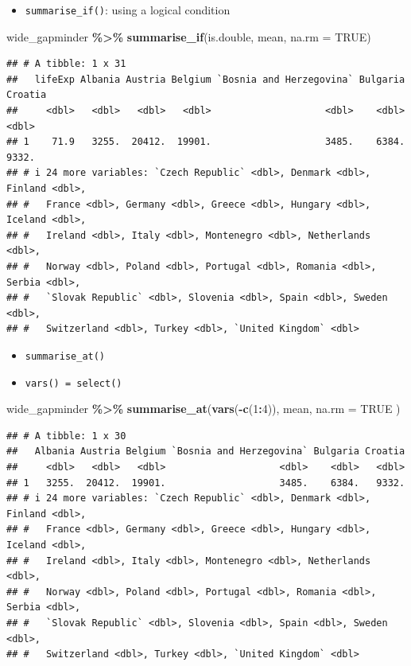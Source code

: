 \documentclass[
]{book}
\newenvironment{Shaded}{\begin{snugshade}}{\end{snugshade}}
\newcommand{\AttributeTok}[1]{\textcolor[rgb]{0.13,0.29,0.53}{#1}}
\newcommand{\ConstantTok}[1]{\textcolor[rgb]{0.56,0.35,0.01}{#1}}
\newcommand{\DecValTok}[1]{\textcolor[rgb]{0.00,0.00,0.81}{#1}}
\newcommand{\FunctionTok}[1]{\textcolor[rgb]{0.13,0.29,0.53}{\textbf{#1}}}
\newcommand{\NormalTok}[1]{#1}
\newcommand{\SpecialCharTok}[1]{\textcolor[rgb]{0.81,0.36,0.00}{\textbf{#1}}}
\providecommand{\tightlist}{%
  \setlength{\itemsep}{0pt}\setlength{\parskip}{0pt}}
\begin{document}
\begin{itemize}
\tightlist
\item
  \texttt{summarise\_if()}: using a logical condition
\end{itemize}

\begin{Shaded}
\begin{Highlighting}[]
\NormalTok{wide\_gapminder }\SpecialCharTok{\%\textgreater{}\%}
  \FunctionTok{summarise\_if}\NormalTok{(is.double, mean, }\AttributeTok{na.rm =} \ConstantTok{TRUE}\NormalTok{)}
\end{Highlighting}
\end{Shaded}

\begin{verbatim}
## # A tibble: 1 x 31
##   lifeExp Albania Austria Belgium `Bosnia and Herzegovina` Bulgaria Croatia
##     <dbl>   <dbl>   <dbl>   <dbl>                    <dbl>    <dbl>   <dbl>
## 1    71.9   3255.  20412.  19901.                    3485.    6384.   9332.
## # i 24 more variables: `Czech Republic` <dbl>, Denmark <dbl>, Finland <dbl>,
## #   France <dbl>, Germany <dbl>, Greece <dbl>, Hungary <dbl>, Iceland <dbl>,
## #   Ireland <dbl>, Italy <dbl>, Montenegro <dbl>, Netherlands <dbl>,
## #   Norway <dbl>, Poland <dbl>, Portugal <dbl>, Romania <dbl>, Serbia <dbl>,
## #   `Slovak Republic` <dbl>, Slovenia <dbl>, Spain <dbl>, Sweden <dbl>,
## #   Switzerland <dbl>, Turkey <dbl>, `United Kingdom` <dbl>
\end{verbatim}

\begin{itemize}
\item
  \texttt{summarise\_at()}
\item
  \texttt{vars()\ =\ select()}
\end{itemize}

\begin{Shaded}
\begin{Highlighting}[]
\NormalTok{wide\_gapminder }\SpecialCharTok{\%\textgreater{}\%}
  \FunctionTok{summarise\_at}\NormalTok{(}\FunctionTok{vars}\NormalTok{(}\SpecialCharTok{{-}}\FunctionTok{c}\NormalTok{(}\DecValTok{1}\SpecialCharTok{:}\DecValTok{4}\NormalTok{)),}
\NormalTok{    mean,}
    \AttributeTok{na.rm =} \ConstantTok{TRUE}
\NormalTok{  )}
\end{Highlighting}
\end{Shaded}

\begin{verbatim}
## # A tibble: 1 x 30
##   Albania Austria Belgium `Bosnia and Herzegovina` Bulgaria Croatia
##     <dbl>   <dbl>   <dbl>                    <dbl>    <dbl>   <dbl>
## 1   3255.  20412.  19901.                    3485.    6384.   9332.
## # i 24 more variables: `Czech Republic` <dbl>, Denmark <dbl>, Finland <dbl>,
## #   France <dbl>, Germany <dbl>, Greece <dbl>, Hungary <dbl>, Iceland <dbl>,
## #   Ireland <dbl>, Italy <dbl>, Montenegro <dbl>, Netherlands <dbl>,
## #   Norway <dbl>, Poland <dbl>, Portugal <dbl>, Romania <dbl>, Serbia <dbl>,
## #   `Slovak Republic` <dbl>, Slovenia <dbl>, Spain <dbl>, Sweden <dbl>,
## #   Switzerland <dbl>, Turkey <dbl>, `United Kingdom` <dbl>
\end{verbatim}
\end{document}

